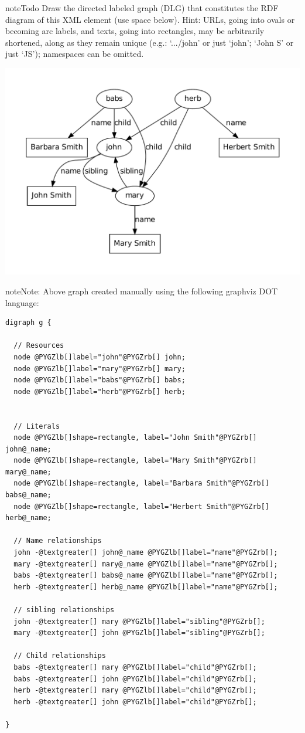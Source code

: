 \documentclass[letterpaper,10pt,english]{sphinxmanual}
\begin{document}
\begin{notice}{note}{Todo}
Draw the directed labeled graph (DLG) that constitutes the RDF diagram of this XML element (use space below).
Hint: URLs, going into ovals or becoming arc labels, and texts, going into rectangles, may be arbitrarily shortened, along as they remain unique (e.g.: `.../john' or just `john'; `John S' or just `JS'); namespaces can be omitted.
\end{notice}

\includegraphics{graphviz-8e0c61029aff928c1e78e03b06cf7f755d84a4b6.pdf}

\begin{notice}{note}{Note:}
Above graph created manually using the following graphviz DOT language:

\begin{Verbatim}[commandchars=@\[\]]
digraph g {

  // Resources
  node @PYGZlb[]label="john"@PYGZrb[] john;
  node @PYGZlb[]label="mary"@PYGZrb[] mary;
  node @PYGZlb[]label="babs"@PYGZrb[] babs;
  node @PYGZlb[]label="herb"@PYGZrb[] herb;


  // Literals
  node @PYGZlb[]shape=rectangle, label="John Smith"@PYGZrb[] john@_name;
  node @PYGZlb[]shape=rectangle, label="Mary Smith"@PYGZrb[] mary@_name;
  node @PYGZlb[]shape=rectangle, label="Barbara Smith"@PYGZrb[] babs@_name;
  node @PYGZlb[]shape=rectangle, label="Herbert Smith"@PYGZrb[] herb@_name;

  // Name relationships
  john -@textgreater[] john@_name @PYGZlb[]label="name"@PYGZrb[];
  mary -@textgreater[] mary@_name @PYGZlb[]label="name"@PYGZrb[];
  babs -@textgreater[] babs@_name @PYGZlb[]label="name"@PYGZrb[];
  herb -@textgreater[] herb@_name @PYGZlb[]label="name"@PYGZrb[];

  // sibling relationships
  john -@textgreater[] mary @PYGZlb[]label="sibling"@PYGZrb[];
  mary -@textgreater[] john @PYGZlb[]label="sibling"@PYGZrb[];

  // Child relationships
  babs -@textgreater[] mary @PYGZlb[]label="child"@PYGZrb[];
  babs -@textgreater[] john @PYGZlb[]label="child"@PYGZrb[];
  herb -@textgreater[] mary @PYGZlb[]label="child"@PYGZrb[];
  herb -@textgreater[] john @PYGZlb[]label="child"@PYGZrb[];

}
\end{Verbatim}
\end{notice}
\end{document}
